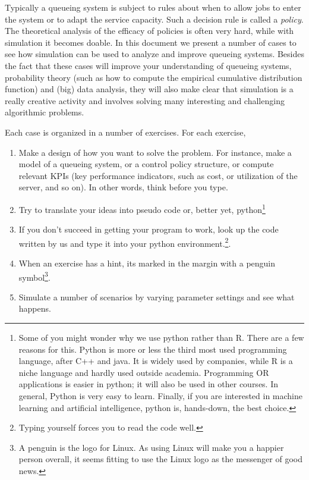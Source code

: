 Typically a queueing system is subject to rules about when to allow jobs to enter the system or to adapt the service capacity.
Such a decision rule is called a \emph{policy}.
The theoretical analysis of the efficacy of policies is often very hard, while with simulation it becomes doable.
In this document we present a number of cases to see how simulation can be used to analyze and improve queueing systems.
Besides the fact that these cases will improve your understanding of queueing systems, probability theory (such as how to compute the empirical cumulative distribution function) and (big) data analysis, they will also make clear that simulation is a really creative activity and involves solving many interesting and challenging algorithmic problems.


Each case is organized in a number of exercises.
For each exercise,
\begin{enumerate}
\item Make a design of how you want to solve the problem.
  For instance, make a model of a queueing system, or a control policy structure, or compute relevant KPIs (key performance indicators, such as cost, or utilization of the server, and so on).
  In other words, think before you type.
\item Try to translate your ideas into pseudo code or, better yet, python\footnote{Some of you might wonder why we use python rather than R.
    There are a few reasons for this.
    Python is more or less the third most used programming language, after C++ and java.
    It is widely used by companies, while R is a niche language and hardly used outside academia.
    Programming OR applications is easier in python; it will also be used in other courses.
    In general, Python is very easy to learn.
    Finally, if you are interested in machine learning and artificial intelligence, python is, hands-down, the best choice.}
  \item If you don't succeed in getting your program to work,  look up the code written by us and type it into your python environment.\footnote{Typing yourself forces you to read the code well.}.
  \item When an exercise has a hint, its marked in the margin with a penguin symbol\footnote{A penguin is the logo for Linux.
      As using Linux will make you a happier person overall, it seems fitting to use the Linux logo as the messenger of good news.}.
    
  \item Simulate a number of scenarios by varying parameter settings and see what happens.
\end{enumerate}

